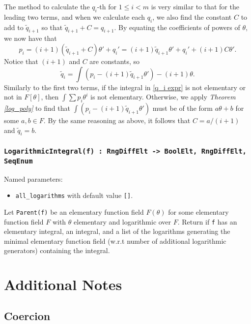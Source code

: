 \documentclass{article}
\theoremstyle{plain}
\theoremstyle{definition}
\newcommand{\thmref}[1]{\emph{Theorem \ref{#1}}}
\begin{document}
The method to calculate the $q_i$-th for $1 \leq i < m$ is very similar to that
for the leading two terms, and when we calculate each $q_i$, we also find the
constant $C$ to add to $\tilde q_{i + 1}$ so that $\tilde q_{i + 1} + C =
q_{i + 1}$. By equating the coefficients of powers of $\theta$, we now have that
\begin{equation}
    p_i
        = (i + 1)(\tilde q_{i + 1} + C) \theta' + q_i'
        = (i + 1)\tilde q_{i + 1} \theta' + q_i' + (i + 1)C\theta'.
\end{equation}
Notice that $(i + 1)$ and $C$ are constants, so
\begin{equation} \label{q_i expr}
    \tilde q_i = \int(p_i - (i + 1) \tilde q_{i + 1}\theta') - (i + 1)\theta.
\end{equation}
Similarly to the first two terms, if the integral in \eqref{q_i expr} is not
elementary or not in $F[\theta]$, then $\int \sum p_i \theta^i$ is not
elementary. Otherwise, we apply \thmref{log_poly} to find that
$\int(p_i - (i + 1) \tilde q_{i + 1} \theta')$ must be of the form $a\theta +
b$ for some $a, b \in F$. By the same reasoning as above, it follows that $C =
a/(i + 1)$ and $\tilde q_i = b$.

\subsubsection*{\lstinline{LogarithmicIntegral(f) : RngDiffElt -> BoolElt, RngDiffElt, SeqEnum}}

Named parameters:
\begin{itemize}
    \item[] \lstinline{all_logarithms} with default value \lstinline{[]}.
\end{itemize}

Let \lstinline{Parent(f)} be an elementary function field $F(\theta)$ for some
elementary function field $F$ with $\theta$ elementary and logarithmic over $F$.
Return if \lstinline{f} has an elementary integral, an integral, and a list of
the logarithms generating the minimal elementary function field (w.r.t number of
additional logarithmic generators) containing the integral.

\section{Additional Notes}

\subsection{Coercion}
\end{document}

